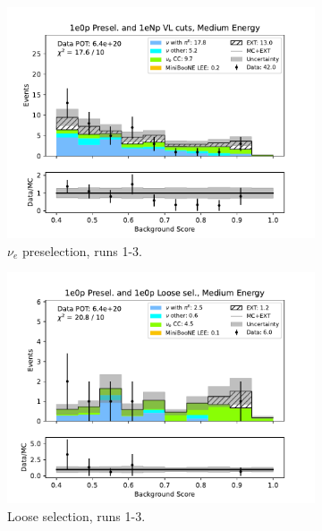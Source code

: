 \begin{figure}[H]
    \centering
    \begin{subfigure}{0.5\linewidth}
        \includegraphics[width=\linewidth]{technote/Sidebands/Figures/NearSideband/near_sideband_bkg_score_run123_ZP_ZP_MEDIUM_ENERGY.pdf}
        \caption{$\nu_e$ preselection, runs 1-3.}
    \end{subfigure}%
    \begin{subfigure}{0.5\linewidth}
        \includegraphics[width=\linewidth]{technote/Sidebands/Figures/NearSideband/near_sideband_bkg_score_run123_ZP_ZPLOOSESEL_MEDIUM_ENERGY.pdf}
        \caption{Loose selection, runs 1-3.}
    \end{subfigure}
    \begin{subfigure}{0.5\linewidth}

\end{subfigure}
\end{figure}
